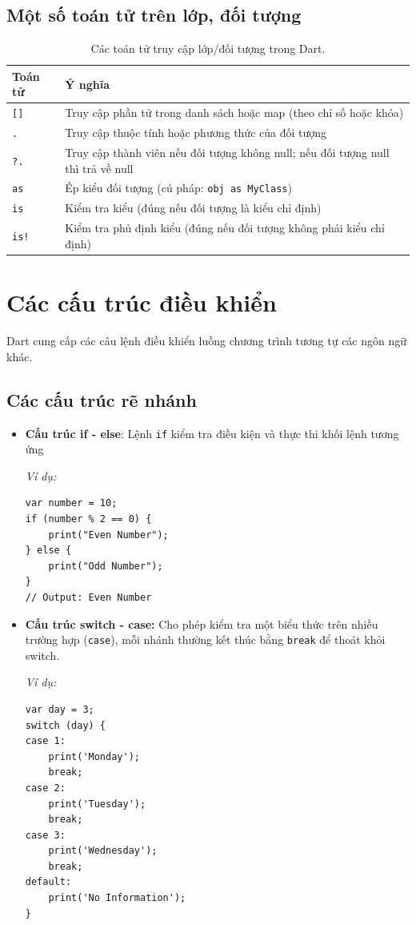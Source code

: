 \documentclass[../DoAn.tex]{subfiles}
\numberwithin{figure}{chapter}
\begin{document}
\subsection{Một số toán tử trên lớp, đối tượng}
\begin{table}[H]
\centering
\begin{tabular}{|>{\centering\arraybackslash}p{4cm}|>{\centering\arraybackslash}p{9cm}|}
\hline
\textbf{Toán tử} & \textbf{Ý nghĩa} \\ \hline
\texttt{[]} & Truy cập phần tử trong danh sách hoặc map (theo chỉ số hoặc khóa) \\ \hline
\texttt{.} & Truy cập thuộc tính hoặc phương thức của đối tượng \\ \hline
\texttt{?.} & Truy cập thành viên nếu đối tượng không null; nếu đối tượng null thì trả về null \\ \hline
\texttt{as} & Ép kiểu đối tượng (cú pháp: \texttt{obj as MyClass}) \\ \hline
\texttt{is} & Kiểm tra kiểu (đúng nếu đối tượng là kiểu chỉ định) \\ \hline
\texttt{is!} & Kiểm tra phủ định kiểu (đúng nếu đối tượng không phải kiểu chỉ định) \\ \hline
\end{tabular}
\caption{Các toán tử truy cập lớp/đối tượng trong Dart.}
\label{tab:operators_in_class_and_object}
\end{table}

\section{Các cấu trúc điều khiển}
Dart cung cấp các câu lệnh điều khiển luồng chương trình tương tự các ngôn ngữ khác. 
\subsection{Các cấu trúc rẽ nhánh}
\begin{itemize}
\item \textbf{Cấu trúc if - else}: Lệnh \texttt{if} kiểm tra điều kiện và thực thi khối lệnh tương ứng

\textit{Ví dụ:} 
\begin{lstlisting}
var number = 10;
if (number % 2 == 0) { 
    print("Even Number"); 
} else { 
    print("Odd Number"); 
} 
// Output: Even Number
\end{lstlisting}

\item \textbf{Cấu trúc switch - case:} Cho phép kiểm tra một biểu thức trên nhiều trường hợp (\texttt{case}), mỗi nhánh thường kết thúc bằng \texttt{break} để thoát khỏi switch.

\textit{Ví dụ:} 
\begin{lstlisting}
var day = 3;
switch (day) { 
case 1: 
    print('Monday'); 
    break; 
case 2: 
    print('Tuesday'); 
    break; 
case 3: 
    print('Wednesday'); 
    break; 
default: 
    print('No Information'); 
}
\end{lstlisting}
\end{itemize}
\end{document}
